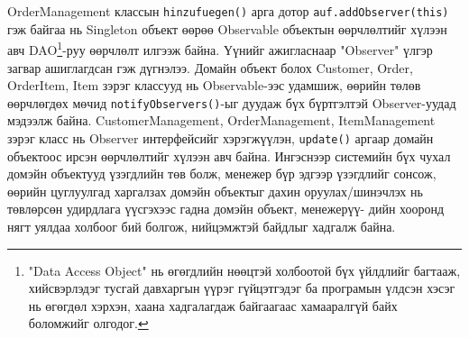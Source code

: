 OrderManagement классын \verb|hinzufuegen()| арга дотор \verb|auf.addObserver(this)| гэж байгаа нь Singleton объект өөрөө Observable объектын өөрчлөлтийг хүлээн авч DAO\footnote{"Data Access Object" нь өгөгдлийн нөөцтэй холбоотой бүх үйлдлийг багтааж, хийсвэрлэдэг тусгай давхаргын үүрэг гүйцэтгэдэг ба програмын үлдсэн хэсэг нь өгөгдөл хэрхэн, хаана хадгалагдаж байгаагаас хамааралгүй байх боломжийг олгодог.}-руу өөрчлөлт илгээж байна. Үүнийг ажигласнаар "Observer" үлгэр загвар ашиглагдсан гэж дүгнэлээ. Домайн объект болох Customer, Order, OrderItem, Item зэрэг классууд нь Observable-ээс удамшиж, өөрийн төлөв өөрчлөгдөх мөчид \verb|notifyObservers()|-ыг дуудаж бүх бүртгэлтэй Observer-уудад мэдээлж байна. CustomerManagement, OrderManagement, ItemManagement зэрэг класс нь Observer интерфейсийг хэрэгжүүлэн, \verb|update()| аргаар домайн объектоос ирсэн өөрчлөлтийг хүлээн авч байна. Ингэснээр системийн бүх чухал домэйн объектууд үзэгдлийн төв болж, менежер бүр эдгээр үзэгдлийг сонсож, өөрийн цуглуулгад харгалзах домэйн объектыг дахин оруулах/шинэчлэх нь төвлөрсөн удирдлага үүсгэхээс гадна домэйн объект, менежерүү- дийн хооронд нягт уялдаа холбоог бий болгож, нийцэмжтэй байдлыг хадгалж байна.

